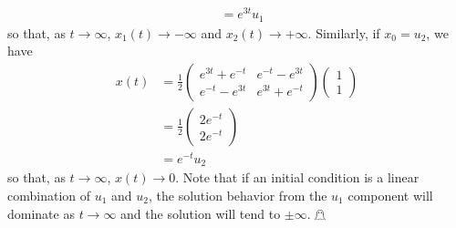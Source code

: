 \documentclass{article}
\begin{document}
\begin{itemize}
\begin{itemize}
\begin{align*}
            &= e^{3t}u_1
        \end{align*}
        so that, as $t \to \infty$, $x_1(t) \to -\infty$ and $x_2(t) \to +\infty$. Similarly, if $x_0 = u_2$, we have
        \begin{align*}
            x(t) &= \frac{1}{2}\begin{pmatrix}
                e^{3t} + e^{-t} & e^{-t} - e^{3t}\\
                e^{-t} - e^{3t} & e^{3t} + e^{-t}
            \end{pmatrix}\begin{pmatrix}
                1\\
                1
            \end{pmatrix}\\
            &= \frac{1}{2}\begin{pmatrix}
                2e^{-t}\\
                2e^{-t}
            \end{pmatrix}\\
            &= e^{-t}u_2
        \end{align*}
        so that, as $t \to \infty$, $x(t) \to 0$. Note that if an initial condition is a linear combination of $u_1$ and $u_2$, the solution behavior from the $u_1$ component will dominate as $t \to \infty$ and the solution will tend to $\pm \infty$. \hfill $\mathghost$



\end{itemize}
\end{itemize}
\end{document}

